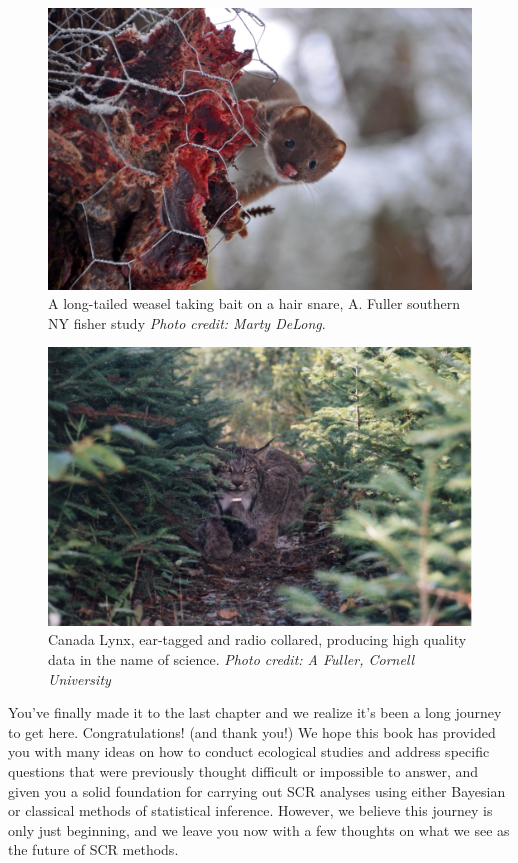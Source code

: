 \begin{figure}[h!]
\centering
\includegraphics[width=\textwidth]{Ch20-Last/weasel.jpg}
\caption{
A long-tailed weasel taking bait on a hair snare, A. Fuller southern NY fisher study
{\it Photo credit: Marty DeLong}.
}
\label{last.fig.weasels}
\end{figure}



\begin{figure}[h!]
\centering
\includegraphics[width=\textwidth]{Ch20-Last/lynx.jpg}
\caption{
Canada Lynx, ear-tagged and radio collared, producing high quality
data in the name of science.
{\it Photo credit: A Fuller, Cornell University} }
\label{last.fig.lynx}
\end{figure}

You've finally made it to the last chapter and we realize it's been a
long journey to get here. Congratulations! (and thank you!) 
We hope this book has
provided you with many ideas on how to conduct ecological studies and
address specific questions that were previously thought difficult or
impossible to answer, and given you a solid foundation for carrying
out SCR analyses using either Bayesian or classical methods of
statistical inference.  However, we believe this journey is only just
beginning, and we leave you now with a few thoughts on what we see as
the future of SCR methods.


